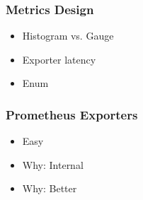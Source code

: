 \begin{frame}
\frametitle{Metrics Design}

\begin{itemize}
\item Histogram vs. Gauge\pause
\item Exporter latency\pause
\item Enum
\end{itemize}
\end{frame}

\begin{frame}
\frametitle{Prometheus Exporters}

\begin{itemize}
\item Easy\pause
\item Why: Internal\pause
\item Why: Better
\end{itemize}

\end{frame}


